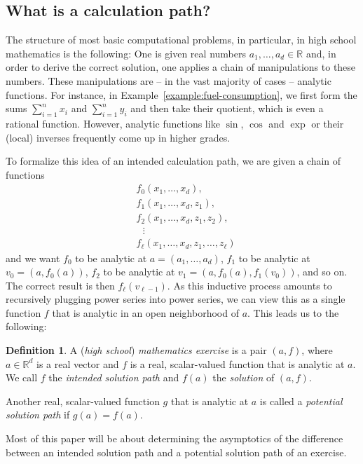 \documentclass[11pt]{amsart}
\numberwithin{equation}{section}
\theoremstyle{plain}
\theoremstyle{definition}
\newtheorem{definition}[theorem]{Definition}
\newcommand{\R}{\mathbb{R}}
\begin{document}
\subsection{What is a calculation path?} 
The structure of most basic computational problems, in particular, in high school mathematics is the following: One is given real numbers $a_1,\ldots,a_d \in \R$ and, in order to derive the correct solution, one applies a chain of manipulations to these numbers. These manipulations are -- in the vast majority of cases -- analytic functions. For instance, in Example~\ref{example:fuel-consumption}, we first form the sums $\sum_{i = 1}^n x_i$ and $\sum_{i = 1}^n y_i$ and then take their quotient, which is even a rational function. However, analytic functions like $\sin$, $\cos$ and $\exp$ or their (local) inverses frequently come up in higher grades.

To formalize this idea of an intended calculation path, we are given a chain of functions 
\begin{align*}
    &f_0(x_1,\ldots,x_d), \\
    &f_1(x_1,\ldots,x_d,z_1),\\
    &f_2(x_1,\ldots,x_d,z_1,z_2),\\
    & \ \ \  \vdots\\
    &f_\ell(x_1,\ldots,x_d,z_1,\ldots,z_\ell)
\end{align*}
and we want $f_0$ to be analytic at $a = (a_1,\ldots,a_d)$, $f_1$ to be analytic at $v_0 = ({a}, f_0({a}))$, $f_2$ to be analytic at $v_1 = ({a}, f_0 ({a}),f_1(v_0))$, and so on.
The correct result is then $f_\ell(v_{\ell-1})$. As this inductive process amounts to recursively plugging power series into power series, we can view this as a single function $f$ that is analytic in an open neighborhood of $a$. This leads us to the following:

\begin{definition}\label{definition:calculation-problem}
    A (\emph{high school}) \emph{mathematics exercise} is a pair $(a,f)$, where $a \in \R^d$ is a real vector and $f$ is a real, scalar-valued function that is analytic at $a$. We call $f$ the \emph{intended solution path}  and $f(a)$ the \emph{solution} of $(a,f)$.

    Another real, scalar-valued function $g$ that is analytic at $a$ is called a \emph{potential solution path} if $g(a) = f(a)$.
\end{definition}

Most of this paper will be about determining the asymptotics of the difference between an intended solution path and a potential solution path of an exercise.
\end{document}
